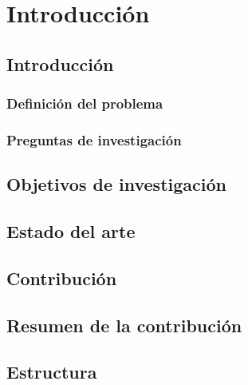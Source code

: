 % 
% 
% 
% 
% 
% 
% 
% 

\chapter{Introducción}
\label{cha:introduccion}


\section{Introducción}
\label{sec:introduccion}

\subsection{Definición del problema}
\label{sec:definicion-problema}

\subsection{Preguntas de investigación}
\label{sec:preguntas-investigacion}

\section{Objetivos de investigación}
\label{sec:objetivos-investigacion}

\section{Estado del arte}
\label{sec:estado-arte}

\section{Contribución}
\label{sec:contribucion}

\section{Resumen de la contribución}
\label{sec:resumen-contribucion}

\section{Estructura}
\label{sec:estructura}









